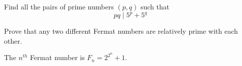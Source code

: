 \begin{problem}[China 2009]
	Find all the pairs of prime numbers $ (p,q)$ such that $$ pq \mid 5^p+5^q$$ %
\end{problem}

%
%

\begin{problem}
	Prove that any two different Fermat numbers are relatively prime with each other.
\end{problem}

\begin{note}
	The $n^{th}$ Fermat number is $F_n = 2^{2^n} + 1$.
\end{note}



